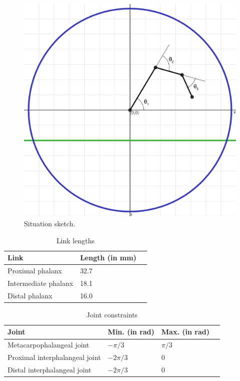 \documentclass{article}
\begin{document}
\begin{figure}[h!]
\centering
\includegraphics[scale=0.15]{situation.png}
\caption{Situation sketch.}
\end{figure}

\begin{table}[h!]
\centering
\caption{Link lengths}
\label{my-label}
\begin{tabular}{lll}
\hline
\textbf{Link}                 & \textbf{Length} (in mm) &  \\\hline
Proximal phalanx     & 32.7           &  \\
Intermediate phalanx & 18.1           &  \\
Distal phalanx       & 16.0           & \\\hline
\end{tabular}
\end{table}

\begin{table}[h!]
\centering
\caption{Joint constraints}
\label{my-label}
\begin{tabular}{llll}
\hline
\textbf{Joint}                 & \textbf{Min.} (in rad) & \textbf{Max.} (in rad) & \\\hline
Metacarpophalangeal joint & \(-\pi/3\) & \(\pi/3\)\\
Proximal interphalangeal joint  & \(-2\pi/3\) & 0\\
Distal interphalangeal joint  & \(-2\pi/3\) & 0\\\hline
\end{tabular}
\end{table}
\end{document}

